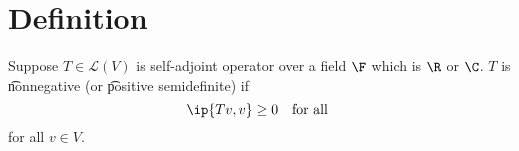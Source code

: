 
\section*{Definition}

Suppose $T \in \mathcal{L} (V)$ is self-adjoint operator over a field $\F $ which is $\R $ or $\C $.
$T$ is \t{nonnegative} (or \t{positive semidefinite}) if
\[
\ip{Tv, v} \geq 0 \quad \text{for all }
\]
for all $v \in V$.

\blankpage
